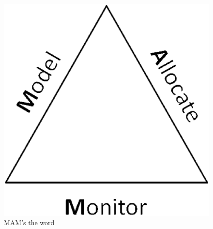 \begin{figure}[!ht]
\centering
\includegraphics[scale=0.3]{mam.eps}
\caption[MAM's the word]{MAM's the word}\label{fig:mam}
\end{figure}
